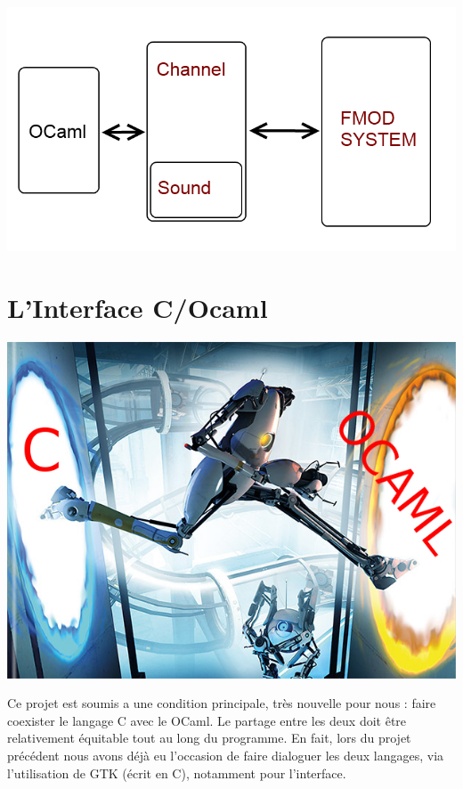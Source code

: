 \documentclass[12pt,a4paper]{report}
\begin{document}
\begin{center}
\includegraphics[scale=0.5]{fmod.png}
\end{center}

\chapter{L'Interface C/Ocaml}

\begin{center}
\includegraphics[scale=0.5]{COcaml.jpg}
\end{center}

Ce projet est soumis a une condition principale, très nouvelle pour nous : faire coexister le langage C avec le OCaml. Le partage entre les deux doit être relativement équitable tout au long du programme. En fait, lors du projet précédent nous avons déjà eu l'occasion de faire dialoguer les deux langages, via l'utilisation de GTK (écrit en C), notamment pour l'interface.\\
\end{document}
